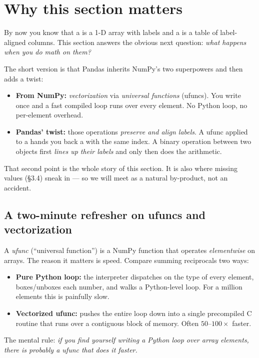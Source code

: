 \documentclass[11pt]{article}
\begin{document}

\section{Why this section matters}

\begin{background}
By now you know that a  is a 1-D array with labels and a  is a table of label-aligned columns. This section answers the obvious next question: \emph{what happens when you do math on them?}

The short version is that Pandas inherits NumPy's two superpowers and then adds a twist:
\begin{itemize}
  \item \textbf{From NumPy:} \emph{vectorization} via \emph{universal functions} (ufuncs). You write  once and a fast compiled loop runs over every element. No Python  loop, no per-element overhead.
  \item \textbf{Pandas' twist:} those operations \emph{preserve and align labels}. A ufunc applied to a  hands you back a  with the same index. A binary operation between two objects first \emph{lines up their labels} and only then does the arithmetic.
\end{itemize}
That second point is the whole story of this section. It is also where missing values (\S3.4) sneak in --- so we will meet  as a natural by-product, not an accident.
\end{background}

\subsection*{A two-minute refresher on ufuncs and vectorization}

\begin{pyrefresh}
A \emph{ufunc} (``universal function'') is a NumPy function that operates \emph{elementwise} on arrays. The reason it matters is speed. Compare summing reciprocals two ways:

\begin{itemize}
  \item \textbf{Pure Python loop:} the interpreter dispatches on the type of every element, boxes/unboxes each number, and walks a Python-level loop. For a million elements this is painfully slow.
  \item \textbf{Vectorized ufunc:}  pushes the entire loop down into a single precompiled C routine that runs over a contiguous block of memory. Often $50$--$100\times$ faster.
\end{itemize}
The mental rule: \emph{if you find yourself writing a Python  loop over array elements, there is probably a ufunc that does it faster.}
\end{pyrefresh}
\end{document}
